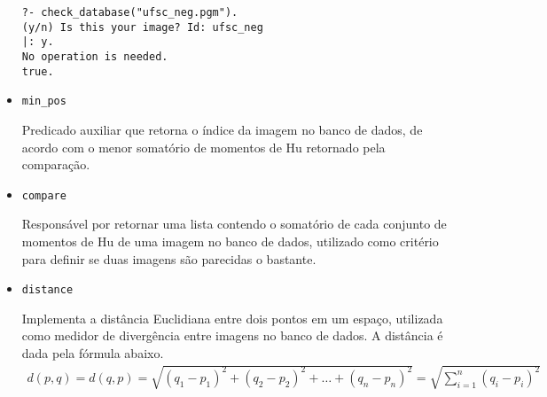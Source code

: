 \documentclass{article}
\begin{document}
\begin{itemize}
\begin{verbatim}
?- check_database("ufsc_neg.pgm").
(y/n) Is this your image? Id: ufsc_neg
|: y.
No operation is needed.
true.
\end{verbatim}

\item \texttt{min\_pos}

Predicado auxiliar que retorna o índice da imagem no banco de dados, de acordo
com o menor somatório de momentos de Hu retornado pela comparação.

\item \texttt{compare}

Responsável por retornar uma lista contendo o somatório de cada conjunto de
momentos de Hu de uma imagem no banco de dados, utilizado como critério para
definir se duas imagens são parecidas o bastante.

\item \texttt{distance}

Implementa a distância Euclidiana entre dois pontos em um espaço, utilizada
como medidor de divergência entre imagens no banco de dados. A distância é dada
pela fórmula abaixo.
\begin{gather*}
d(p,q) = d(q,p)
= \sqrt{(q_1 - p_1)^2 + (q_2 - p_2)^2 + \dots + (q_n - p_n)^2}
= \sqrt{\sum\limits_{i=1}^{n} (q_i - p_i)^2}
\end{gather*}

\end{itemize}
\end{document}
